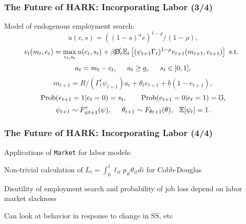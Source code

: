   \begin{frame}
    \frametitle{The Future of HARK: Incorporating Labor (3/4)}
    Model of endogenous employment search:
    \begin{equation*}
      u(c,s) = ((1-s)^\alpha c)^{1-\rho}/(1-\rho),
    \end{equation*}
    \begin{equation*}
      v_t(m_t,e_t) = \max_{c_t,s_t} u(c_t,s_t) + \beta \cancel{\mathsf{D}}_t \mathbb{E}_t \left[(\psi_{t+1} \Gamma_t)^{1-\rho} v_{t+1}(m_{t+1},e_{t+1}) \right] \text{ s.t. }
    \end{equation*}
    \begin{equation*}
      a_t = m_t - c_t, \hspace{0.5cm} a_t \geq \underline{a}, \hspace{0.5cm} s_t \in [0,1],
    \end{equation*}
    \begin{equation*}
      m_{t+1} = R/(\Gamma^e_t \psi_{t+1}) a_t + \theta_t e_{t+1} + \underline{b}(1-e_{t+1}),
    \end{equation*}
    \begin{equation*}
      \operatorname{Prob}(e_{t+1} = 1 | e_t = 0) = s_t, \qquad \operatorname{Prob}(e_{t+1} = 0 | e_t = 1) = \mho,
    \end{equation*}
    \begin{equation*}
      \psi_{t+1} \sim F^e_{\psi t+1}(\psi), \hspace{0.5cm} \theta_{t+1} \sim F_{\theta t+1}(\theta), \hspace{0.25cm} \mathbb{E}[\psi_t] = 1.
    \end{equation*}
  \end{frame}



  \begin{frame}
    \frametitle{The Future of HARK: Incorporating Labor (4/4)}
    Applications of \texttt{Market} for labor models:
    \bi
  \item Non-trivial calculation of $L_t = \int_0^1 \ell_{it} p_{it} \theta_{it} di$ for Cobb-Douglas

  \item Disutility of employment search and probability of job loss depend on labor market slackness

  \item Can look at behavior in response to change in SS, etc
    \ei

    \hyperlink{DiscussionTopics}{}
  \end{frame}

